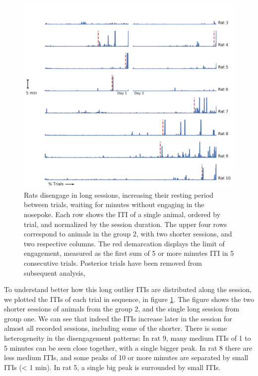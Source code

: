     \begin{figure}[ht!]
        \centering
        \includegraphics[width=\textwidth]{figures/inter_trial_alongtrial.png}
        \caption[Rats disengage in long sessions]{Rats disengage in long sessions, increasing their resting period between trials, waiting for minutes without engaging in the nosepoke. Each row shows the ITI of a single animal, ordered by trial, and normalized by the session duration. The upper four rows correspond to animals in the group 2, with two shorter sessions, and two respective columns. The red demarcation displays the limit of engagement, measured as the first sum of 5 or more minutes ITI in 5 consecutive trials. Posterior trials have been removed from subsequent analysis,}
        \label{fig:iti}
    \end{figure}
    
    
    To understand better how this long outlier ITIs are distributed along the session, we plotted the ITIs of each trial in sequence, in figure \ref{fig:iti}. The figure shows the two shorter sessions of animals from the group 2, and the single long session from group one. We can see that indeed the ITIs increase later in the session for almost all recorded sessions, including some of the shorter. There is some heterogeneity in the disengagement patterns: In rat 9, many medium ITIs of 1 to 5 minutes can be seen close together, with a single bigger peak. In rat 8 there are less medium ITIs, and some peaks of 10 or more minutes are separated by small ITIs (< 1 min). In rat 5, a single big peak is surrounded by small ITIs.
    
